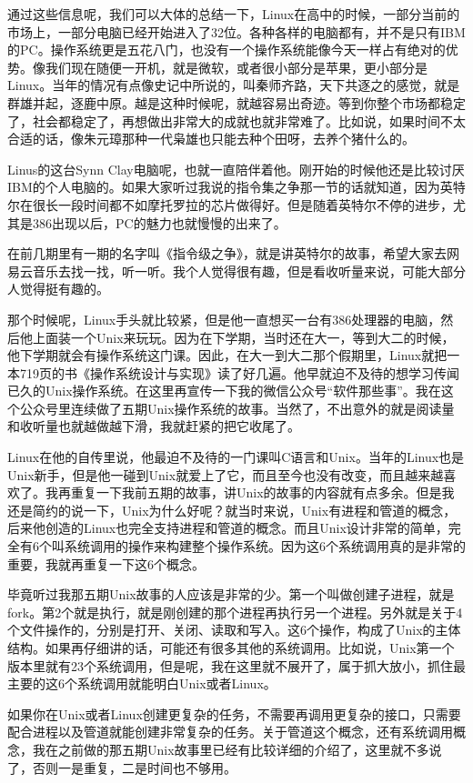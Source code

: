 \documentclass[
  letterpaper,
  DIV=11,
  numbers=noendperiod]{scrreprt}
\begin{document}
通过这些信息呢，我们可以大体的总结一下，Linux在高中的时候，一部分当前的市场上，一部分电脑已经开始进入了32位。各种各样的电脑都有，并不是只有IBM的PC。操作系统更是五花八门，也没有一个操作系统能像今天一样占有绝对的优势。像我们现在随便一开机，就是微软，或者很小部分是苹果，更小部分是Linux。当年的情况有点像史记中所说的，叫秦师齐路，天下共逐之的感觉，就是群雄并起，逐鹿中原。越是这种时候呢，就越容易出奇迹。等到你整个市场都稳定了，社会都稳定了，再想做出非常大的成就也就非常难了。比如说，如果时间不太合适的话，像朱元璋那种一代枭雄也只能去种个田呀，去养个猪什么的。

Linus的这台Synn
Clay电脑呢，也就一直陪伴着他。刚开始的时候他还是比较讨厌IBM的个人电脑的。如果大家听过我说的指令集之争那一节的话就知道，因为英特尔在很长一段时间都不如摩托罗拉的芯片做得好。但是随着英特尔不停的进步，尤其是386出现以后，PC的魅力也就慢慢的出来了。

在前几期里有一期的名字叫《指令级之争》，就是讲英特尔的故事，希望大家去网易云音乐去找一找，听一听。我个人觉得很有趣，但是看收听量来说，可能大部分人觉得挺有趣的。

那个时候呢，Linux手头就比较紧，但是他一直想买一台有386处理器的电脑，然后他上面装一个Unix来玩玩。因为在下学期，当时还在大一，等到大二的时候，他下学期就会有操作系统这门课。因此，在大一到大二那个假期里，Linux就把一本719页的书《操作系统设计与实现》读了好几遍。他早就迫不及待的想学习传闻已久的Unix操作系统。在这里再宣传一下我的微信公众号``软件那些事''。我在这个公众号里连续做了五期Unix操作系统的故事。当然了，不出意外的就是阅读量和收听量也就越做越下滑，我就赶紧的把它收尾了。

Linux在他的自传里说，他最迫不及待的一门课叫C语言和Unix。当年的Linux也是Unix新手，但是他一碰到Unix就爱上了它，而且至今也没有改变，而且越来越喜欢了。我再重复一下我前五期的故事，讲Unix的故事的内容就有点多余。但是我还是简约的说一下，Unix为什么好呢？就当时来说，Unix有进程和管道的概念，后来他创造的Linux也完全支持进程和管道的概念。而且Unix设计非常的简单，完全有6个叫系统调用的操作来构建整个操作系统。因为这6个系统调用真的是非常的重要，我就再重复一下这6个概念。

毕竟听过我那五期Unix故事的人应该是非常的少。第一个叫做创建子进程，就是fork。第2个就是执行，就是刚创建的那个进程再执行另一个进程。另外就是关于4个文件操作的，分别是打开、关闭、读取和写入。这6个操作，构成了Unix的主体结构。如果再仔细讲的话，可能还有很多其他的系统调用。比如说，Unix第一个版本里就有23个系统调用，但是呢，我在这里就不展开了，属于抓大放小，抓住最主要的这6个系统调用就能明白Unix或者Linux。

如果你在Unix或者Linux创建更复杂的任务，不需要再调用更复杂的接口，只需要配合进程以及管道就能创建非常复杂的任务。关于管道这个概念，还有系统调用概念，我在之前做的那五期Unix故事里已经有比较详细的介绍了，这里就不多说了，否则一是重复，二是时间也不够用。
\end{document}
